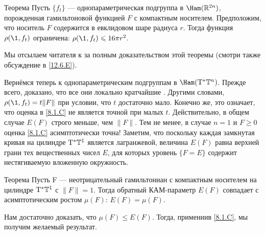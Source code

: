 \begin{thm}{Теорема}\label{8.2.A}
Пусть $\{f_t\}$ — однопараметрическая подгруппа в $\Ham (\RR^{2n})$,
порожденная гамильтоновой функцией $F$ с компактным носителем. 
Предположим, что носитель $F$ содержится в евклидовом шаре радиуса
$r$. 
Тогда функция $\rho (\1, f_t)$ ограничена: $\rho (\1, f_t) \z\le 16\pi
r^2$. 
\end{thm}

Мы отсылаем читателя к \cite[с. 177]{HZ} за полным доказательством
этой теоремы (смотри также обсуждение в \ref{12.6.E}). 

Вернёмся теперь к однопараметрическим подгруппам в $\Ham (\T^\ast \TT^n)$.
Прежде всего, доказано, что все они локально кратчайшие \cite{LM2}.
Другими словами, $\rho (\1, f_t) = t \| F \|$ при условии, что $t$
достаточно мало. 
Конечно же, это означает, что оценка в \ref{8.1.C} не является
точной при малых $t$. 
Действительно, в общем случае $E (F)$ строго меньше, чем $\| F \|$.
Тем не менее, в случае $n = 1$ и $F \ge 0$ оценка \ref{8.1.C}
асимптотически точна! 
Заметим, что поскольку каждая замкнутая кривая на цилиндре $\mathrm{T}^\ast
\mathbb{T}^1$ является лагранжевой, величина $E (F)$ равна верхней грани тех
вещественных чисел $E$, для которых уровень $\{F = E\}$ содержит
нестягиваемую вложенную окружность. 

\begin{thm}[(\cite{PS})]{Теорема}\label{8.2.B}
  Пусть F — неотрицательный гамильтониан с компактным носителем на
  цилиндре $\mathrm{T}^\ast \mathbb{T}^1$ с $\| F \| = 1$. 
  Тогда обратный КАМ-параметр $E (F)$ совпадает с асимптотическим
  ростом $\mu (F)$: $E (F) = \mu (F)$. 
\end{thm}

Нам достаточно доказать, что $\mu (F) \le E (F)$.
Тогда, примениив \ref{8.1.C}, мы получим желаемый результат.

